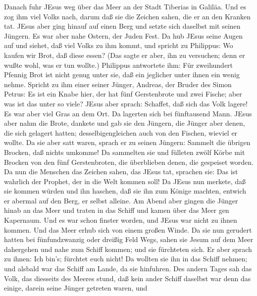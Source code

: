 Danach fuhr JEsus weg über das Meer an der Stadt Tiberias
in Galiläa.  Und es zog ihm viel Volks nach, darum daß sie
die Zeichen sahen, die er an den Kranken tat.  JEsus aber
ging hinauf auf einen Berg und setzte sich daselbst mit seinen Jüngern.
 Es war aber nahe Ostern, der Juden Fest.  Da
hub JEsus seine Augen auf und siehet, daß viel Volks zu ihm kommt, und
spricht zu Philippus: Wo kaufen wir Brot, daß diese essen? 
(Das sagte er aber, ihn zu versuchen; denn er wußte wohl, was er tun
wollte.)  Philippus antwortete ihm: Für zweihundert Pfennig
Brot ist nicht genug unter sie, daß ein jeglicher unter ihnen ein wenig
nehme.  Spricht zu ihm einer seiner Jünger, Andreas, der
Bruder des Simon Petrus:  Es ist ein Knabe hier, der hat
fünf Gerstenbrote und zwei Fische; aber was ist das unter so viele?
 JEsus aber sprach: Schaffet, daß sich das Volk lagere! Es
war aber viel Gras an dem Ort. Da lagerten sich bei fünftausend Mann.
 JEsus aber nahm die Brote, dankete und gab sie den
Jüngern, die Jünger aber denen, die sich gelagert hatten;
desselbigengleichen auch von den Fischen, wieviel er wollte.
 Da sie aber satt waren, sprach er zu seinen Jüngern:
Sammelt die übrigen Brocken, daß nichts umkomme!  Da
sammelten sie und fülleten zwölf Körbe mit Brocken von den fünf
Gerstenbroten, die überblieben denen, die gespeiset worden.
 Da nun die Menschen das Zeichen sahen, das JEsus tat,
sprachen sie: Das ist wahrlich der Prophet, der in die Welt kommen soll!
 Da JEsus nun merkete, daß sie kommen würden und ihn
haschen, daß sie ihn zum Könige machten, entwich er abermal auf den
Berg, er selbst alleine.  Am Abend aber gingen die Jünger
hinab an das Meer  und traten in das Schiff und kamen über
das Meer gen Kapernaum. Und es war schon finster worden, und JEsus war
nicht zu ihnen kommen.  Und das Meer erhub sich von einem
großen Winde.  Da sie nun gerudert hatten bei
fünfundzwanzig oder dreißig Feld Wegs, sahen sie Jesum auf dem Meer
dahergehen und nahe zum Schiff kommen; und sie fürchteten sich.
 Er aber sprach zu ihnen: Ich bin's; fürchtet euch nicht!
 Da wollten sie ihn in das Schiff nehmen; und alsbald war
das Schiff am Lande, da sie hinfuhren.  Des andern Tages
sah das Volk, das diesseits des Meeres stund, daß kein ander Schiff
daselbst war denn das einige, darein seine Jünger getreten waren, und
